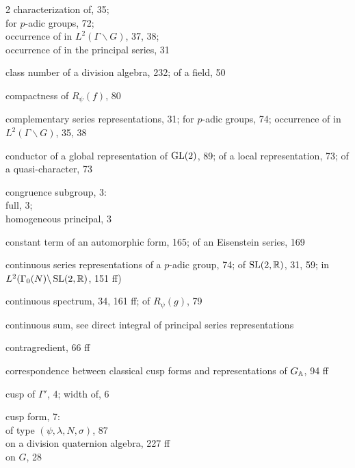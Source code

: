 \begin{multicols}{2}
\hspace*{1em}characterization of, 35;\\
\hspace*{1em}for $p$-adic groups, 72;\\
\hspace*{1em}occurrence of in $L^2(\Gamma\backslash G)$, 37, 38;\\
\hspace*{1em}occurrence of in the principal series, 31\par
\noindent class number of a division algebra, 232; of a field, 50\par
\noindent compactness of $R_\psi(f)$, 80\par
\noindent complementary series representations, 31; for $p$-adic groups, 74; occurrence of in $L^2(\Gamma\backslash G)$, 35, 38\par
\noindent conductor of a global representation of $\operatorname{GL}(2)$, 89; of a local representation, 73; of a quasi-character, 73\par
\noindent congruence subgroup, 3:\\
\hspace*{1em}full, 3;\\
\hspace*{1em}homogeneous principal, 3\par
\noindent constant term of an automorphic form, 165; of an Eisenstein series, 169\par
\noindent continuous series representations of a $p$-adic group, 74; of $\operatorname{SL}(2,\mathbb{R})$, 31, 59; in $L^2(\Gamma_0(N)\backslash\operatorname{SL}(2,\mathbb{R})$, 151 ff)\par
\noindent continuous spectrum, 34, 161 ff; of $R_\psi(g)$, 79\par
\noindent continuous sum, see direct integral of principal series representations\par
\noindent contragredient, 66 ff\par
\noindent correspondence between classical cusp forms and representations of $G_{\mathbb{A}}$, 94 ff\par
\noindent cusp of $\Gamma'$, 4; width of, 6\par
\noindent cusp form, 7:\\
\hspace*{1em}of type $(\psi,\lambda,N,\sigma)$, 87\\
\hspace*{1em}on a division quaternion algebra, 227 ff\\
\hspace*{1em}on $G$, 28\\

\end{multicols}
